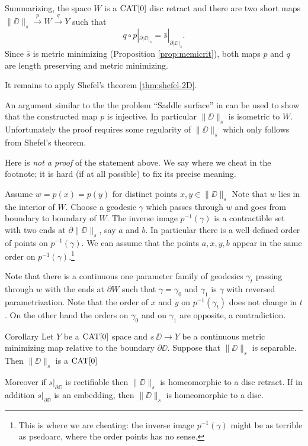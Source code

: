 \documentclass{article}
\begin{document}
Summarizing, the space $W$ is a $\mathop{\rm CAT}\nolimits[0]$ disc retract and
 there are two short maps 
$\|\DD\|_s\xrightarrow{p} W \xrightarrow{q} Y$
such that 
\[q\circ p|_{\partial|\DD|_s}=\bar s|_{\partial|\DD|_s}.\] 
Since $\bar s$ is metric minimizing (Proposition \ref{prop:memicrit}), both maps $p$ and $q$ are length preserving and metric minimizing.

It remains to apply Shefel's theorem \ref{thm:shefel-2D}.


\qeds



An argument similar to the the problem ``Saddle surface'' in \cite{petrunin-orthodox} can be used to show that the constructed map $p$ is injective. 
In particular $\|\DD\|_s$ is isometric to $W$.
Unfortunately the proof requires some regularity of $\|\DD\|_s$ which only follows from Shefel's theorem. 

Here is \emph{not a proof} of the statement above.
We say where we cheat in the footnote; 
it is hard (if at all possible) to fix its precise meaning.

 Assume  $w=p(x)=p(y)$ for distinct points $x,y\in\|\DD\|_s$
Note that  $w$ lies in the interior of $W$.
Choose a geodesic $\gamma$ which passes through $w$ and goes 
from boundary to boundary of $W$.
The inverse image $p^{-1}(\gamma)$ is a contractible set with two ends at $\partial\|\DD\|_s$, say $a$ and $b$.
In particular there is a well defined order of  points on $p^{-1}(\gamma)$.
We can assume that the points $a,x,y,b$ appear in the same order on $p^{-1}(\gamma)$.\footnote{This is where we are cheating: the inverse image $p^{-1}(\gamma)$ might be as terrible as psedoarc, where the order points has no sense.}

Note that there is a continuous one parameter family of geodesics $\gamma_t$ passing through $w$ with the ends at $\partial W$
such that $\gamma=\gamma_0$ and $\gamma_1$ is $\gamma$ with reversed parametrization.
Note that the order of $x$ and $y$ on $p^{-1}(\gamma_t)$ does not change in $t$.
On the other hand the orders on $\gamma_0$ and on $\gamma_1$ are opposite, a contradiction.\qeds 

\begin{thm}{Corollary}\label{cor:main}
Let $Y$ be a $\mathop{\rm CAT}\nolimits[0]$ space 
and $s\:\DD\to Y$ be a continuous metric minimizing map relative to the boundary $\partial\DD$.
Suppose that $\|\DD\|_s$  is separable.
Then $\|\DD\|_s$ is a $\mathop{\rm CAT}\nolimits[0]$

Moreover if $s|_{\partial\DD}$ is rectifiable then $\|\DD\|_s$ is homeomorphic to a  disc retract. 
If in addition  $s|_{\partial\DD}$ is an embedding,
then $\|\DD\|_s$ is homeomorphic to a disc.
\end{thm}
\end{document}
